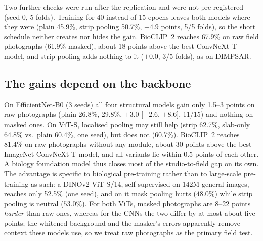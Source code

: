 Two further checks were run after the replication and were not pre-registered (seed 0, 5 folds).
Training for 40 instead of 15 epochs leaves both models where they were (plain 45.9\%, strip pooling
50.7\%, $+4.9$ points, 5/5 folds), so the short schedule neither creates nor hides the gain. BioCLIP~2
reaches 67.9\% on raw field photographs (61.9\% masked), about 18 points above the best ConvNeXt-T
model, and strip pooling adds nothing to it ($+0.0$, 3/5 folds), as on DIMPSAR.

\begin{table}[t]
\centering
\caption{Pre-registered contrasts on LeafSnap30 field photographs (ConvNeXt-T, 10 matched runs,
30-way accuracy). Columns as in \cref{tab:contrasts}; one Holm family.}
\label{tab:leafsnap}
\small
\resizebox{\linewidth}{!}{}
\end{table}

\subsection{The gains depend on the backbone}
On EfficientNet-B0 (3 seeds) all four structural models gain only 1.5--3 points on raw photographs
(plain 26.8\%, \SVA{} 29.8\%, $+3.0$ [$-2.6$, $+8.6$], 11/15) and nothing on masked ones. On ViT-S,
localised pooling may still help (strip 62.7\%, slab-only 64.8\% vs.\ plain 60.4\%, one seed), but
\SVA{} does not (60.7\%). BioCLIP~2 reaches 81.4\% on raw photographs without any module, about
30 points above the best ImageNet ConvNeXt-T model, and all variants lie within 0.5 points of each
other. A biology foundation model thus closes most of the studio-to-field gap on its own.
The advantage is specific to biological pre-training rather than to large-scale pre-training as such: a DINOv2 ViT-S/14, self-supervised on 142M general images, reaches only 52.5\% (one seed), and on it mask pooling hurts ($48.0\%$) while strip pooling is neutral ($53.0\%$). For both
ViTs, masked photographs are 8--22 points \emph{harder} than raw ones, whereas for the CNNs the two
differ by at most about five points; the whitened background and the masker's errors apparently remove context these models
use, so we treat raw photographs as the primary field test.

